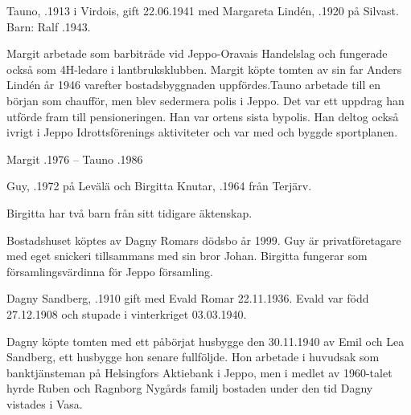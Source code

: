 Tauno, .1913 i Virdois, gift 22.06.1941 med  Margareta Lindén, .1920 på Silvast.
Barn: Ralf .1943.

Margit arbetade som barbiträde vid Jeppo-Oravais Handelslag och fungerade också som 4H-ledare i lantbruksklubben. Margit köpte tomten av sin far Anders Lindén år 1946 varefter bostadsbyggnaden uppfördes.Tauno arbetade till en början som chaufför, men blev sedermera polis i Jeppo. Det var ett uppdrag han utförde fram till pensioneringen. Han var ortens sista bypolis. Han deltog också ivrigt i  Jeppo  Idrottsförenings aktiviteter och var med och byggde sportplanen.

Margit .1976  --  Tauno .1986



Guy, .1972 på Levälä och Birgitta Knutar, .1964 från Terjärv.
\begin{jhchildren}
  \item {}
\end{jhchildren}



Birgitta har två barn från sitt tidigare äktenskap.
\begin{jhchildren}
  \item {}
  \item {}
\end{jhchildren}

Bostadshuset köptes av Dagny Romars dödsbo år 1999. Guy är privatföretagare med eget snickeri tillsammans med sin bror Johan. Birgitta fungerar som församlingsvärdinna för Jeppo församling.


Dagny Sandberg, .1910 gift med Evald Romar 22.11.1936. Evald var född 27.12.1908 och stupade i vinterkriget 03.03.1940.
\begin{jhchildren}
  \item {}
  \item {}
\end{jhchildren}

Dagny köpte tomten med ett påbörjat husbygge den 30.11.1940 av Emil och Lea Sandberg, ett husbygge hon senare fullföljde. Hon arbetade i huvudsak som banktjänsteman på Helsingfors Aktiebank i Jeppo, men i medlet av 1960-talet hyrde Ruben och Ragnborg Nygårds familj bostaden under den tid Dagny vistades i Vasa.

